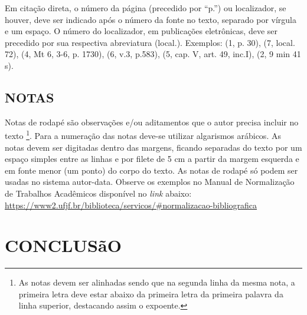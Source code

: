 \documentclass[
  oneside, %
  english,
  brazil
]{abntbibufjf}
\begin{document}
Em citação direta, o número da página (precedido por ``p.'') ou localizador, se houver, deve ser indicado após o número da fonte no texto, separado por vírgula e um espaço. O número do localizador, em publicações eletrônicas, deve ser precedido por sua respectiva abreviatura (local.). Exemplos: (1, p. 30), (7, local. 72), (4, Mt 6, 3-6, p. 1730), (6, v.3, p.583), (5, cap. V, art. 49, inc.I), (2, 9 min 41 s).

\section{NOTAS} %

Notas de rodapé são observaç\~{o}es e/ou aditamentos que o autor precisa incluir no texto \footnote[2]{As notas devem ser alinhadas sendo que na segunda linha da mesma nota, a primeira letra deve estar abaixo da primeira letra da primeira palavra da linha superior, destacando assim o expoente.}. Para a numeraç\~{a}o das notas deve-se utilizar algarismos arábicos. As notas devem ser digitadas dentro das margens, ficando separadas do texto por um espaço simples entre as linhas e por filete de 5 cm a partir da margem esquerda e em fonte menor (um ponto) do corpo do texto. As notas de rodapé só podem ser usadas no sistema autor-data. Observe os exemplos no Manual de Normalizaç\~{a}o de Trabalhos Acadêmicos disponível no \textit{link} abaixo: \\
\url{https://www2.ufjf.br/biblioteca/servicos/#normalizacao-bibliografica}




\chapter{CONCLUSãO} %
\end{document}
